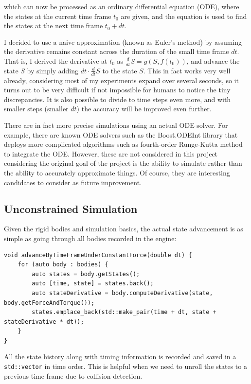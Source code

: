 \documentclass[12pt,a4paper,twoside,openright]{report}
\newcommand{\code}{\texttt}
\begin{document}
which can now be processed as an ordinary differential equation (ODE), where the states at the current time frame $t_0$ are given, and the equation is used to find the states at the next time frame $t_0 + dt$.

I decided to use a naive approximation (known as Euler's method) by assuming the derivative remains constant across the duration of the small time frame $dt$. That is, I derived the derivative at $t_0$ as $\frac{d}{dt}S=g(S, f(t_0))$, and advance the state $S$ by simply adding $dt \cdot \frac{d}{dt}S$ to the state $S$. This in fact works very well already, considering most of my experiments expand over several seconds, so it turns out to be very difficult if not impossible for humans to notice the tiny discrepancies. It is also possible to divide to time steps even more, and with smaller steps (smaller $dt$) the accuracy will be improved even further.

There are in fact more precise simulations using an actual ODE solver. For example, there are known ODE solvers such as the Boost.ODEInt library that deploys more complicated algorithms such as fourth-order Runge-Kutta method to integrate the ODE. However, these are not considered in this project considering the original goal of the project is the ability to simulate rather than the ability to accurately approximate things. Of course, they are interesting candidates to consider as future improvement.

\subsection{Unconstrained Simulation}

Given the rigid bodies and simulation basics, the actual state advancement is as simple as going through all bodies recorded in the engine:

\begin{verbatim}
void advanceByTimeFrameUnderConstantForce(double dt) {
    for (auto body : bodies) {
        auto states = body.getStates();
        auto [time, state] = states.back();
        auto stateDerivative = body.computeDerivative(state, body.getForceAndTorque());
        states.emplace_back(std::make_pair(time + dt, state + stateDerivative * dt));
    }
}
\end{verbatim}

All the state history along with timing information is recorded and saved in a \code{std::vector} in time order. This is helpful when we need to unroll the states to a previous time frame due to collision detection.
\end{document}
